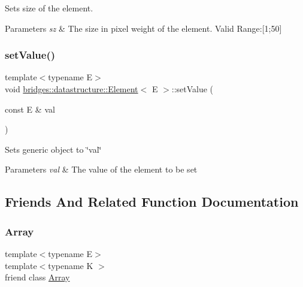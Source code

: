 Sets size of the element. 


\begin{DoxyParams}{Parameters}
{\em sz} & The size in pixel weight of the element. Valid Range\+:\mbox{[}1;50\mbox{]} \\
\hline
\end{DoxyParams}
\mbox{\label{classbridges_1_1datastructure_1_1_element_a26f2aceb9eed7195fd55b3538f3c059f}} 
\subsubsection{\texorpdfstring{set\+Value()}{setValue()}}
{\footnotesize\ttfamily template$<$typename E$>$ \\
void \hyperlink{classbridges_1_1datastructure_1_1_element}{bridges\+::datastructure\+::\+Element}$<$ E $>$\+::set\+Value (\begin{DoxyParamCaption}\item[{const E \&}]{val }\end{DoxyParamCaption})\hspace{0.3cm}{\ttfamily [inline]}}

Sets generic object to \char`\"{}val\char`\"{}


\begin{DoxyParams}{Parameters}
{\em val} & The value of the element to be set \\
\hline
\end{DoxyParams}


\subsection{Friends And Related Function Documentation}
\mbox{\label{classbridges_1_1datastructure_1_1_element_ab1a595168ea1870ce436dfd2d8e69b6d}} 
\subsubsection{\texorpdfstring{Array}{Array}}
{\footnotesize\ttfamily template$<$typename E$>$ \\
template$<$typename K $>$ \\
friend class \hyperlink{classbridges_1_1datastructure_1_1_array}{Array}\hspace{0.3cm}{\ttfamily [friend]}}


